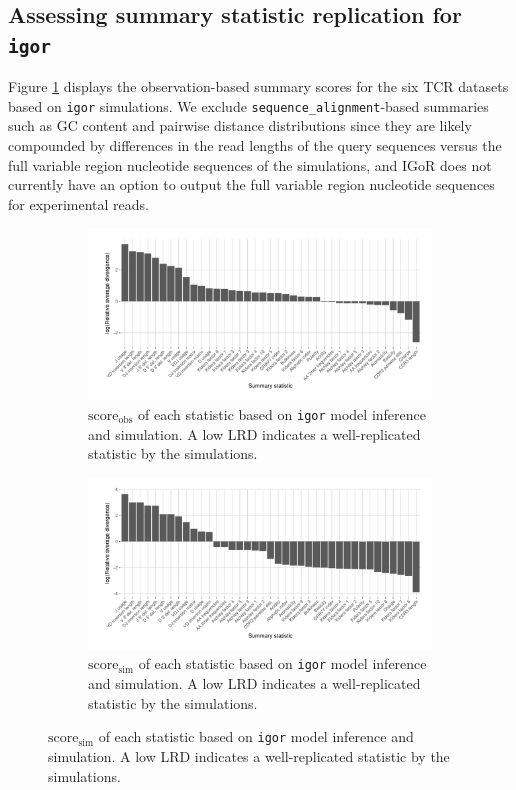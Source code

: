 \documentclass{article}
\begin{document}
\subsection*{Assessing summary statistic replication for \texttt{igor}}
Figure \ref{fig:ObsScoresTCR} displays the observation-based summary scores for the six TCR datasets based on \texttt{igor} simulations.
We exclude \texttt{sequence\_alignment}-based summaries such as GC content and pairwise distance distributions since they are likely compounded by differences in the read lengths of the query sequences versus the full variable region nucleotide sequences of the simulations, and IGoR does not currently have an option to output the full variable region nucleotide sequences for experimental reads.
\begin{figure}
	\begin{subfigure}{\textwidth}
    	\includegraphics[width=\linewidth]{Figures/IgorScores/obs_score_plot.pdf}
    	\caption{$\text{score}_\text{obs}$ of each statistic based on \texttt{igor} model inference and simulation.
        	A low LRD indicates a well-replicated statistic by the simulations.
    	}
    	\label{fig:ObsScoresTCR}
	\end{subfigure}
	\begin{subfigure}{\textwidth}
    	\includegraphics[width=\linewidth]{Figures/IgorScores/sim_score_plot.pdf}
    	\caption{$\text{score}_\text{sim}$ of each statistic based on \texttt{igor} model inference and simulation.
    	    A low LRD indicates a well-replicated statistic by the simulations.
    	}
    	\label{fig:SimScoresTCR}
	\end{subfigure}
\end{figure}
\end{document}
